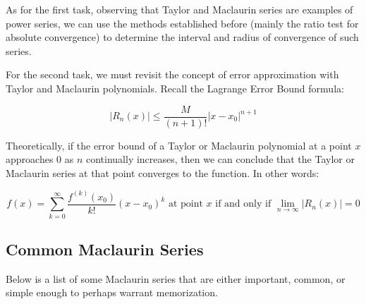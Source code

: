\documentclass[11pt]{article}
\begin{document}
As for the first task, observing that Taylor and Maclaurin series are examples of power series, we can use the methods established before (mainly the ratio test for absolute convergence) to determine the interval and radius of convergence of such series.

For the second task, we must revisit the concept of error approximation with Taylor and Maclaurin polynomials. Recall the Lagrange Error Bound formula:

\[ |R_n(x)| \leq \frac{M}{(n+1)!}|x-x_0|^{n+1}\]

Theoretically, if the error bound of a Taylor or Maclaurin polynomial at a point $x$ approaches $0$ as $n$ continually increases, then we can conclude that the Taylor or Maclaurin series at that point converges to the function. In other words:

\[f(x)=\sum_{k=0}^{\infty} \frac{f^{(k)}(x_0)}{k!}(x-x_0)^k \text{ at point $x$ if and only if } \lim_{n \to \infty}|R_n(x)|=0\]


\subsection{Common Maclaurin Series}
Below is a list of some Maclaurin series that are either important, common, or simple enough to perhaps warrant memorization.
\end{document}
